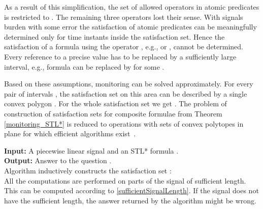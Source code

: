 As a result of this simplification, the set of allowed operators in atomic predicates is restricted to . The remaining three operators lost their sense. With signals burden with some error  the satisfaction of atomic predicates can be meaningfully determined only for time instants inside the satisfaction set. 
Hence the satisfaction of a formula using the operator , e.g.,  or , cannot be determined. Every reference to a precise value has to be replaced by a sufficiently large interval, e.g., formula  can be replaced by  for some .

Based on these assumptions, monitoring can be solved approximately. For every pair of intervals , the satisfaction set on this area can be described by a single convex polygon . For the whole satisfaction set  we get . The problem of construction of satisfaction sets for composite formulae from Theorem \ref{monitoring_STL*} is reduced to operations with sets of convex polytopes in plane for which efficient algorithms exist~\cite{GeometricAlgorithms}. 
 
\begin{algorithm}
\label{algorithm1}

\end{algorithm}
\smallskip
\textbf{Input:} A piecewise linear signal  and an STL* formula .\\
\textbf{Output:} Answer to the question .\\

Algorithm inductively constructs the satisfaction set :\\

All the computations are performed on parts of the signal  of sufficient length. This can be computed according to \eqref{sufficientSignalLength}. If the signal does not have the sufficient length, the answer returned by the algorithm might be wrong. 


